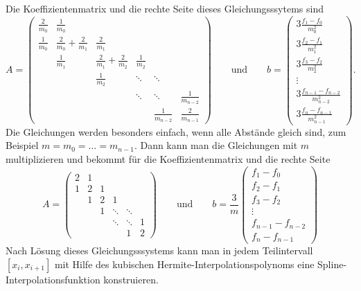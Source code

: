 Die Koeffizientenmatrix und die rechte Seite dieses Gleichungsssytems sind
\[
A
=
\begin{pmatrix}
\displaystyle\frac{2}{m_0}
	&\displaystyle\frac{1}{m_0}
		&
			&
				&
					&
\\[8pt]
\displaystyle\frac{1}{m_0}
	&\displaystyle\frac{2}{m_0}+\frac{2}{m_1}
		&\displaystyle\frac{2}{m_1}
			&
				&
					&
\\[8pt]
	&\displaystyle\frac{1}{m_1}
		&\displaystyle\frac{2}{m_1}+\frac{2}{m_2}
			&\displaystyle\frac{1}{m_2}
				&
					&
\\[8pt]
	&
		&\displaystyle\frac{1}{m_2}
			&\ddots
				&\ddots
					&
\\[8pt]
	&
		&
			&\ddots
				&\ddots
					&\displaystyle\frac{1}{m_{n-2}}
\\[8pt]
	&
		&
			&
				&\displaystyle\frac{1}{m_{n-2}}
					&\displaystyle\frac{2}{m_{n-1}}
\end{pmatrix}
\qquad\text{und}\qquad
b
=
\begin{pmatrix}
\displaystyle3\frac{f_1-f_0}{m_0^2} \\[8pt]
\displaystyle3\frac{f_2-f_1}{m_1^2} \\[8pt]
\displaystyle3\frac{f_3-f_2}{m_2^2} \\[8pt]
\vdots \\[8pt]
\displaystyle3\frac{f_{n-1}-f_{n-2}}{m_{n-2}^2} \\[8pt]
\displaystyle3\frac{f_n-f_{n-1}}{m_{n-1}^2} 
\end{pmatrix}.
\]
Die Gleichungen werden besonders einfach, wenn alle Abstände gleich sind,
zum Beispiel $m=m_0=\dots =m_{n-1}$.
Dann kann man die Gleichungen mit $m$ multiplizieren und bekommt für die
Koeffizientenmatrix und die rechte Seite
\[
A
=
\begin{pmatrix}
2&1& &      &      & \\
1&2&1&      &      & \\
 &1&2&1     &      & \\
 & &1&\ddots&\ddots& \\
 & & &\ddots&\ddots&1\\
 & & &      &     1&2
\end{pmatrix}
\qquad\text{und}\qquad
b
=
\frac{3}{m}
\begin{pmatrix}
f_1-f_0\\
f_2-f_1\\
f_3-f_2\\
\vdots\\
f_{n-1}-f_{n-2}\\
f_n-f_{n-1}
\end{pmatrix}
\]
Nach Lösung dieses Gleichungsssystems kann man in jedem Teilintervall
$[x_i,x_{i+1}]$ mit Hilfe des kubischen Hermite-Interpolationspolynoms
eine Spline-Interpolationsfunktion konstruieren.
%
%


